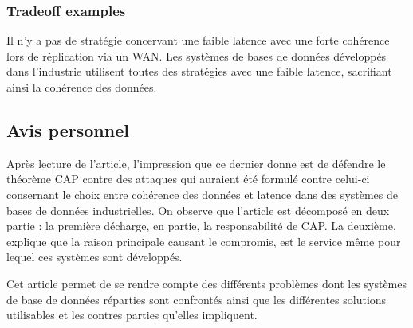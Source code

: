 \subsubsection{Tradeoff examples}
Il n'y a pas de stratégie concervant une faible latence avec une forte cohérence lors de réplication via un WAN.
Les systèmes de bases de données développés dans l'industrie utilisent toutes des stratégies avec une faible latence, sacrifiant ainsi la cohérence des données.


\subsection{Avis personnel}

Après lecture de l'article, l'impression que ce dernier donne est de défendre le théorème CAP contre des attaques qui auraient été formulé contre celui-ci consernant le choix entre cohérence des données et latence dans des systèmes de bases de données industrielles.
On observe que l'article est décomposé en deux partie : la première décharge, en partie, la responsabilité de CAP. La deuxième, explique que la raison principale causant le compromis, est le service même pour lequel ces systèmes sont développés.

Cet article permet de se rendre compte des différents problèmes dont les systèmes de base de données réparties sont confrontés ainsi que les différentes solutions utilisables et les contres parties qu'elles impliquent.
